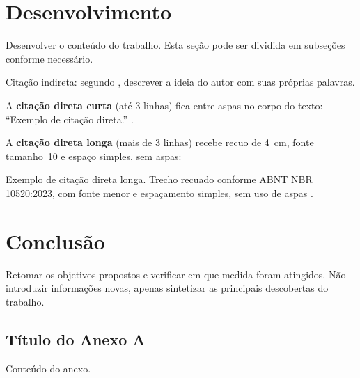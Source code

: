 \documentclass[
  12pt,
  a4paper,
  oneside,
  brazil,
  chapter=TITLE
]{abntex2}
\begin{document}
\chapter{Desenvolvimento}
\label{cap:desenvolvimento}

Desenvolver o conteúdo do trabalho. Esta seção pode ser
dividida em subseções conforme necessário.

Citação indireta: segundo \cite{GIL2010}, descrever
a ideia do autor com suas próprias palavras.

A \textbf{citação direta curta} (até 3 linhas) fica entre
aspas no corpo do texto: ``Exemplo de citação
direta.'' \cite[p.~10]{MARCONI2017}.

A \textbf{citação direta longa} (mais de 3 linhas) recebe
recuo de 4~cm, fonte tamanho~10 e espaço simples, sem aspas:

\begin{citacao}
  Exemplo de citação direta longa. Trecho recuado conforme
  ABNT NBR 10520:2023, com fonte menor e espaçamento simples,
  sem uso de aspas \cite[p.~21]{MINAYO2014}.
\end{citacao}

\chapter{Conclusão}
\label{cap:conclusao}

Retomar os objetivos propostos e verificar em que medida foram
atingidos. Não introduzir informações novas, apenas sintetizar
as principais descobertas do trabalho.

\postextual



\begin{anexosenv}

\chapter{Título do Anexo A}
\label{anx:a}

Conteúdo do anexo.

\end{anexosenv}
\end{document}
